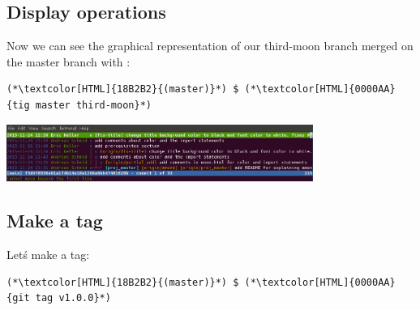\subsection{Display operations}
\begin{frame}[fragile]
  \subslidetitle

  Now we can see the graphical representation of our third-moon branch merged on the master branch with :
  \begin{lstlisting}
(*\textcolor[HTML]{18B2B2}{(master)}*) $ (*\textcolor[HTML]{0000AA}{tig master third-moon}*)
\end{lstlisting}

  \vspace{1em}

  \centerline{\includegraphics[width=10cm]{../screen/tig-fix-title-rebase-master.png}}

\end{frame}

\subsection{Make a tag}
\begin{frame}[fragile]
  \subslidetitle

  Let\'s make a tag: 
  \begin{lstlisting}
(*\textcolor[HTML]{18B2B2}{(master)}*) $ (*\textcolor[HTML]{0000AA}{git tag v1.0.0}*)
\end{lstlisting}

\end{frame}


